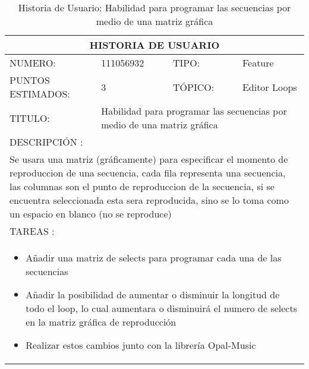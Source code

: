 \begin{table}[h]
\centering
\renewcommand{\arraystretch}{1.4}
\begin{tabular}{|*{4}{l|}}
\hline
\multicolumn{4}{|c|}{HISTORIA DE USUARIO} \\ \hline
NUMERO: & 111056932 & TIPO: & Feature \\ \hline
PUNTOS ESTIMADOS: & 3 & TÓPICO: & Editor Loops \\ \hline
TITULO: & \multicolumn{3}{|p{7.2cm}|}{Habilidad para programar las secuencias por medio de una matriz gráfica} \\ \hline
\multicolumn{4}{|l|}{DESCRIPCIÓN : } \\ \hline
\multicolumn{4}{|p{11cm}|}{Se usara una matriz (gráficamente) para especificar el momento de reproduccion de una secuencia, cada fila representa una secuencia, las columnas son el punto de reproduccion de la secuencia, si se encuentra seleccionada esta sera reproducida, sino se lo toma como un espacio en blanco (no se reproduce)} \\ \hline
\multicolumn{4}{|l|}{TAREAS : } \\ \hline
\multicolumn{4}{|p{11cm}|}{
\begin{minipage}[t]{\hsize}
  \begin{itemize}
    \item Añadir una matriz de selects para programar cada una de las secuencias
    \item Añadir la posibilidad de aumentar o disminuir la longitud de todo el loop, lo cual aumentara o disminuirá el numero de selects en la matriz gráfica de reproducción
    \item Realizar estos cambios junto con la librería Opal-Music
  \end{itemize}
\end{minipage}
} \\ \hline
\end{tabular}
\caption{Historia de Usuario: Habilidad para programar las secuencias por medio de una matriz gráfica}
\label{tab:Primero}
\end{table}

